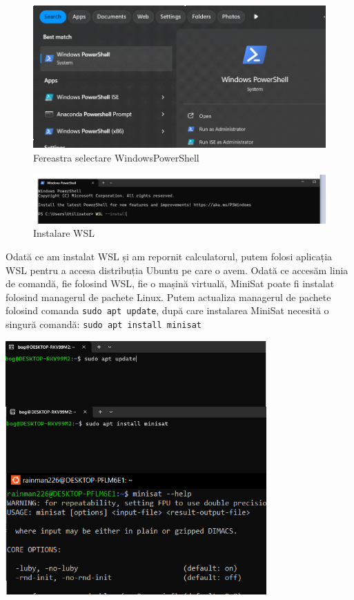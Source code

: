 \documentclass[runningheads]{llncs}
\begin{document}
\begin{figure}
    \centering
    \includegraphics[width=0.75\linewidth]{images/3_instalare/1.png}
    \caption{Fereastra selectare WindowsPowerShell}
    \label{fig:2}
\end{figure}

\begin{figure}
    \centering
    \includegraphics[width=0.75\linewidth]{images/3_instalare/2.png}
    \caption{Instalare WSL}
    \label{fig:enter-label}
\end{figure}

Odată ce am instalat WSL și am repornit calculatorul, putem folosi aplicația WSL pentru a accesa distribuția Ubuntu pe care o avem. Odată ce accesăm linia de comandă, fie folosind WSL, fie o mașină virtuală, MiniSat poate fi instalat folosind managerul de pachete Linux. Putem actualiza managerul de pachete folosind comanda \texttt{sudo apt update}, după care instalarea MiniSat necesită o singură comandă: \texttt{sudo apt install minisat}

\begin{center}
    \includegraphics[width=0.75\textwidth]{images/3_instalare/3.png}
\end{center}
\end{document}
